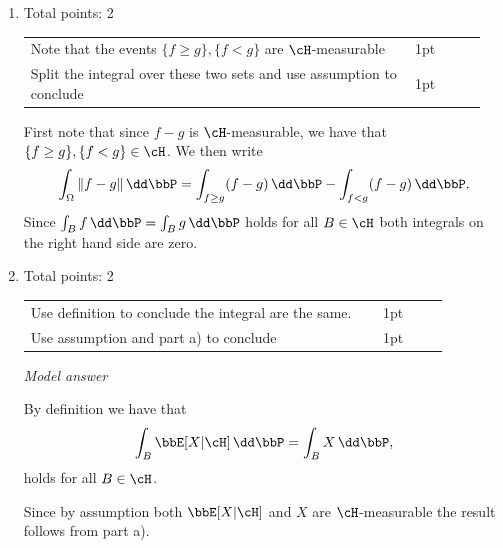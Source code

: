 \documentclass{lecturenotes}
\begin{document}
\begin{enumerate}[label={(\alph*)}]
\item Total points: 2\hfill

\begin{tabular}{p{0.8\linewidth}p{0.15\linewidth}}
\hline
Note that the events $\{f \ge g\}, \{f < g\}$ are $\cH$-measurable & 1pt\\
Split the integral over these two sets and use assumption to conclude & 1pt\\
\hline
\end{tabular}

First note that since $f-g$ is $\cH$-measurable, we have that $\{f \ge g\}, \{f < g\} \in \cH$. We then write
\[
	\int_\Omega \|f-g\| \, \dd \bbP = \int_{f \ge g} (f-g) \, \dd \bbP - \int_{f < g} (f-g) \, \dd \bbP.
\]
Since $\int_B f \, \dd \bbP = \int_B g \, \dd \bbP$ holds for all $B \in \cH$ both integrals on the right hand side are zero.

\item Total points: 2\hfill

\begin{tabular}{p{0.8\linewidth}p{0.15\linewidth}}
\hline
Use definition to conclude the integral are the same. & 1pt\\
Use assumption and part a) to conclude & 1pt\\
\hline
\end{tabular}

\textit{Model answer}


By definition we have that
\[
	\int_B \bbE[X | \cH] \, \dd \bbP = \int_B X \, \dd \bbP,
\]
holds for all $B \in \cH$. 

Since by assumption both $\bbE[X | \cH]$ and $X$ are $\cH$-measurable the result follows from part a).

%
%
%


\end{enumerate}
\end{document}
